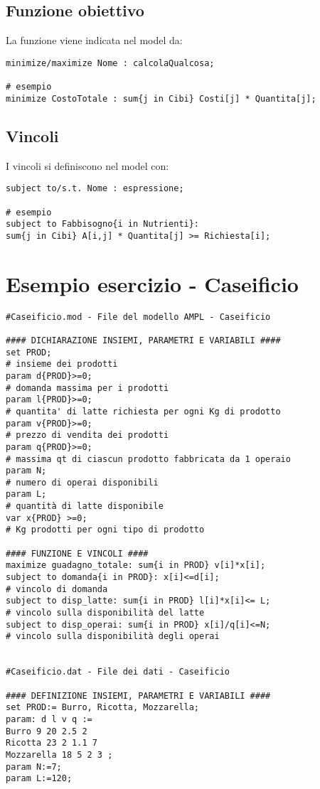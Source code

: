 \subsection{Funzione obiettivo}

La funzione viene indicata nel model da:
\begin{verbatim}
minimize/maximize Nome : calcolaQualcosa;

# esempio
minimize CostoTotale : sum{j in Cibi} Costi[j] * Quantita[j];
\end{verbatim}


\subsection{Vincoli}
I vincoli si definiscono nel model con:
\begin{verbatim}
subject to/s.t. Nome : espressione;

# esempio
subject to Fabbisogno{i in Nutrienti}:
sum{j in Cibi} A[i,j] * Quantita[j] >= Richiesta[i];
\end{verbatim}

\section{Esempio esercizio - Caseificio}
\begin{framed}
\begin{verbatim}
#Caseificio.mod - File del modello AMPL - Caseificio

#### DICHIARAZIONE INSIEMI, PARAMETRI E VARIABILI ####
set PROD;
# insieme dei prodotti
param d{PROD}>=0;
# domanda massima per i prodotti
param l{PROD}>=0;
# quantita' di latte richiesta per ogni Kg di prodotto
param v{PROD}>=0;
# prezzo di vendita dei prodotti
param q{PROD}>=0;
# massima qt di ciascun prodotto fabbricata da 1 operaio
param N;
# numero di operai disponibili
param L;
# quantità di latte disponibile
var x{PROD} >=0;
# Kg prodotti per ogni tipo di prodotto

#### FUNZIONE E VINCOLI ####
maximize guadagno_totale: sum{i in PROD} v[i]*x[i];
subject to domanda{i in PROD}: x[i]<=d[i];
# vincolo di domanda
subject to disp_latte: sum{i in PROD} l[i]*x[i]<= L;
# vincolo sulla disponibilità del latte
subject to disp_operai: sum{i in PROD} x[i]/q[i]<=N;
# vincolo sulla disponibilità degli operai


#Caseificio.dat - File dei dati - Caseificio

#### DEFINIZIONE INSIEMI, PARAMETRI E VARIABILI ####
set PROD:= Burro, Ricotta, Mozzarella;
param: d l v q :=
Burro 9 20 2.5 2
Ricotta 23 2 1.1 7
Mozzarella 18 5 2 3 ;
param N:=7;
param L:=120;
\end{verbatim}
\end{framed}




